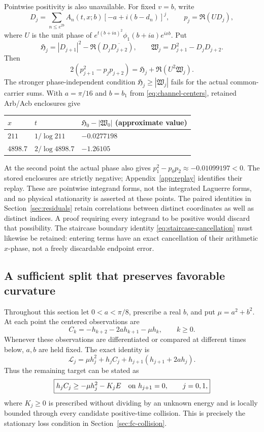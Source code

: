 \documentclass[11pt]{article}
\numberwithin{equation}{section}
\theoremstyle{definition}
\theoremstyle{remark}
\newcommand{\Lag}{\mathcal L}
\begin{document}
Pointwise positivity is also unavailable. For fixed $v=b$, write
\[
 D_j=\sum_{n\le e^{2b}}A_n(t,x;b)[-a+i(b-d_n)]^j,\qquad p_j=\Re(UD_j),
\]
where $U$ is the unit phase of
$e^{t(b+ia)^2}\phi_1(b+ia)e^{ixb}$. Put
\[
 \mathfrak H_j=|D_{j+1}|^2-\Re(D_j\overline{D_{j+2}}),\qquad
 \mathfrak W_j=D_{j+1}^2-D_jD_{j+2}.
\]
Then
\begin{equation}
 2(p_{j+1}^2-p_jp_{j+2})
 =\mathfrak H_j+\Re(U^2\mathfrak W_j).
 \label{eq:phase-projection}
\end{equation}
The stronger phase-independent condition
$\mathfrak H_j\ge|\mathfrak W_j|$ fails for the actual common-carrier
sums. With $a=\pi/16$ and $b=b_1$ from
\eqref{eq:channel-centers}, retained Arb/Acb enclosures give
\begin{center}
\begin{tabular}{@{}lll@{}}
\toprule
$x$ & $t$ & $\mathfrak H_0-|\mathfrak W_0|$ (approximate value)\\
\midrule
$211$ & $1/\log211$ & $-0.0277198$\\
$4898.7$ & $2/\log4898.7$ & $-1.26105$\\
\bottomrule
\end{tabular}
\end{center}
At the second point the actual phase also gives
$p_1^2-p_0p_2\approx-0.01099197<0$. The stored enclosures are strictly
negative; Appendix~\ref{app:replay} identifies their replay. These are
pointwise integrand forms, not the integrated Laguerre forms, and no
physical stationarity is asserted at these points. The paired identities
in Section~\ref{sec:residuals} retain correlations between distinct
coordinates as well as distinct indices. A proof requiring every
integrand to be positive would discard that possibility.
The staircase boundary identity \eqref{eq:staircase-cancellation} must
likewise be retained: entering terms have an exact cancellation of their
arithmetic $x$-phase, not a freely discardable endpoint error.

\subsection{A sufficient split that preserves favorable curvature}

Throughout this section let $0<a<\pi/8$, prescribe a real $b$, and put
$\mu=a^2+b^2$. At each point the centered observations are
\begin{equation}
 C_k=-h_{k+2}-2ah_{k+1}-\mu h_k,\qquad k\ge0.
 \label{eq:all-centered-observations}
\end{equation}
Whenever these observations are differentiated or compared at different
times below, $a,b$ are held fixed. The exact identity is
\[
 \Lag_j=\mu h_j^2+h_jC_j+h_{j+1}(h_{j+1}+2ah_j).
\]
Thus the remaining target can be stated as
\begin{equation}
 \boxed{h_jC_j\ge-\mu h_j^2-K_jE
 \quad\hbox{on }h_{j+1}=0,\qquad j=0,1,}
 \label{eq:final-target}
\end{equation}
where $K_j\ge0$ is prescribed without dividing by an unknown energy and
is locally bounded through every candidate positive-time collision.
This is precisely the stationary loss condition in
Section~\ref{sec:fc-collision}.
\end{document}
